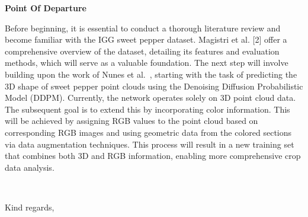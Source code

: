 \documentclass[11pt]{briefcd_3en}
\begin{document}
\begin{letter}{}
\textbf{Point Of Departure}


Before beginning, it is essential to conduct a thorough literature review and become familiar with the IGG sweet pepper dataset. Magistri et al. [2] offer a comprehensive overview of the dataset, detailing its features and evaluation methods, which will serve as a valuable foundation. The next step will involve building upon the work of Nunes et al.~\cite{nunes2024cvpr}, starting with the task of predicting the 3D shape of sweet pepper point clouds using the Denoising Diffusion Probabilistic Model (DDPM). Currently, the network operates solely on 3D point cloud data. The subsequent goal is to extend this by incorporating color information. This will be achieved by assigning RGB values to the point cloud based on corresponding RGB images and using geometric data from the colored sections via data augmentation techniques. This process will result in a new training set that combines both 3D and RGB information, enabling more comprehensive crop data analysis.

~\\[0.5cm]
\closing{Kind regards,}



\end{letter}
\end{document}
